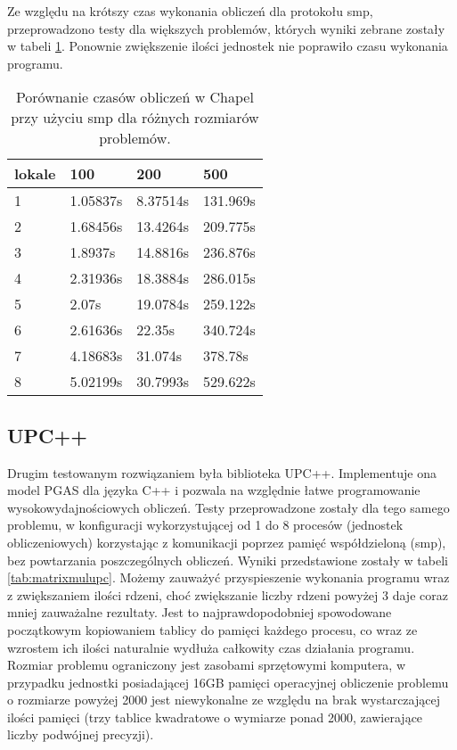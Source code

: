     Ze względu na krótszy czas wykonania obliczeń dla protokołu smp, przeprowadzono testy dla większych problemów, których wyniki zebrane zostały w tabeli \ref{tab:matrixmulchapelsmp}.
    Ponownie zwiększenie ilości jednostek nie poprawiło czasu wykonania programu.
    
    \begin{table}[]
    \centering
    \begin{tabular}{l|l|l|l}
    \textbf{lokale} & \textbf{100} & \textbf{200} & \textbf{500} \\ \hline
    1               & 1.05837s     & 8.37514s     & 131.969s     \\ \hline
    2               & 1.68456s     & 13.4264s     & 209.775s     \\ \hline
    3               & 1.8937s      & 14.8816s     & 236.876s     \\ \hline
    4               & 2.31936s     & 18.3884s     & 286.015s     \\ \hline
    5               & 2.07s        & 19.0784s     & 259.122s     \\ \hline
    6               & 2.61636s     & 22.35s       & 340.724s     \\ \hline
    7               & 4.18683s     & 31.074s      & 378.78s      \\ \hline
    8               & 5.02199s     & 30.7993s     & 529.622s    
    \end{tabular}
    \caption{Porównanie czasów obliczeń w Chapel przy użyciu smp dla różnych rozmiarów problemów.}
    \label{tab:matrixmulchapelsmp}
    \end{table}
    
    \subsection{UPC++}
    Drugim testowanym rozwiązaniem była biblioteka UPC++.
    Implementuje ona model PGAS dla języka C++ i pozwala na względnie łatwe programowanie wysokowydajnościowych obliczeń.
    Testy przeprowadzone zostały dla tego samego problemu, w konfiguracji wykorzystującej od 1 do 8 procesów (jednostek obliczeniowych) korzystając z komunikacji poprzez pamięć współdzieloną (smp), bez powtarzania poszczególnych obliczeń.
    Wyniki przedstawione zostały w tabeli \ref{tab:matrixmulupc}.
    Możemy zauważyć przyspieszenie wykonania programu wraz z zwiększaniem ilości rdzeni, choć zwiększanie liczby rdzeni powyżej 3 daje coraz mniej zauważalne rezultaty.
    Jest to najprawdopodobniej spowodowane początkowym kopiowaniem tablicy do pamięci każdego procesu, co wraz ze wzrostem ich ilości naturalnie wydłuża całkowity czas działania programu.
    Rozmiar problemu ograniczony jest zasobami sprzętowymi komputera, w przypadku jednostki posiadającej 16GB pamięci operacyjnej obliczenie problemu o rozmiarze powyżej 2000 jest niewykonalne ze względu na brak wystarczającej ilości pamięci (trzy tablice kwadratowe o wymiarze ponad 2000, zawierające liczby podwójnej precyzji).
    
